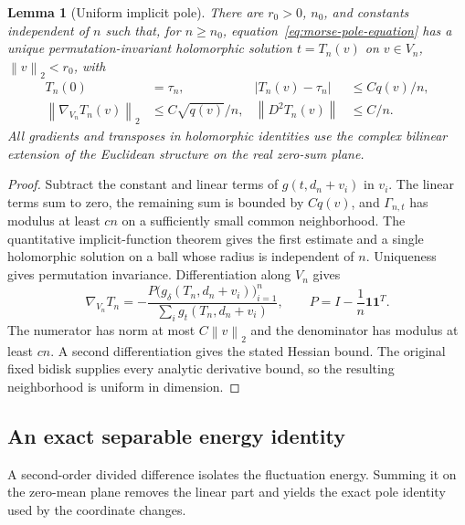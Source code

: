 \documentclass[11pt]{article}
\numberwithin{equation}{section}
\newtheorem{lemma}[theorem]{Lemma}
\theoremstyle{definition}
\newcommand{\norm}[1]{\left\lVert#1\right\rVert}
\begin{document}
\begin{lemma}[Uniform implicit pole]
\label{lem:morse-implicit}
There are $r_0>0$, $n_0$, and constants independent of $n$ such that, for
$n\ge n_0$, equation~\eqref{eq:morse-pole-equation} has a unique
permutation-invariant holomorphic solution $t=T_n(v)$ on
$v\in V_n$, $\norm{v}_2<r_0$, with
\begin{align}
 T_n(0)&=\tau_n,&
 |T_n(v)-\tau_n|&\le Cq(v)/n,\label{eq:morse-T-bound}\\
 \norm{\nabla_{V_n}T_n(v)}_2&\le C\sqrt{q(v)}/n,&
 \norm{D^2T_n(v)}&\le C/n.\label{eq:morse-T-derivatives}
\end{align}
All gradients and transposes in holomorphic identities use the complex
bilinear extension of the Euclidean structure on the real zero-sum plane.
\end{lemma}

\begin{proof}
Subtract the constant and linear terms of $g(t,d_n+v_i)$ in $v_i$.
The linear terms sum to zero, the remaining sum is bounded by $Cq(v)$,
and $\Gamma_{n,t}$ has modulus at least $cn$ on a sufficiently small
common neighborhood.  The quantitative implicit-function theorem gives
the first estimate and a single holomorphic solution on a ball whose
radius is independent of $n$.  Uniqueness gives permutation invariance.
Differentiation along $V_n$ gives
\[
 \nabla_{V_n}T_n
 =-\frac{P\bigl(g_\delta(T_n,d_n+v_i)\bigr)_{i=1}^n}
 {\sum_i g_t(T_n,d_n+v_i)},
 \qquad P=I-\frac1n\mathbf1\mathbf1^T.
\]
The numerator has norm at most $C\norm v_2$ and the denominator has
modulus at least $cn$.  A second differentiation gives the stated
Hessian bound.  The original fixed bidisk supplies every analytic derivative bound,
so the resulting neighborhood is uniform in dimension.
\end{proof}

\subsection{An exact separable energy identity}

A second-order divided difference isolates the fluctuation energy.
Summing it on the zero-mean plane removes the linear part and yields
the exact pole identity used by the coordinate changes.
\end{document}
